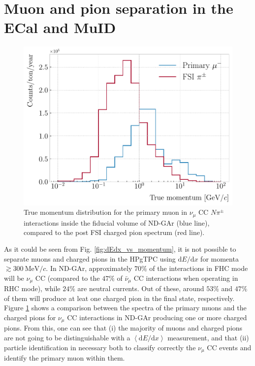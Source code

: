 \section{Muon and pion separation in the ECal and MuID}\label{section:muon_bdt}

\begin{figure}[t]
	\centering
	\includegraphics[width=.70\linewidth]{Images/GArSoft_PID/BDT/ndgar_fhc_numu_cc_mu_spectrum.pdf}
	\caption[True momentum distribution for the primary muon in $\nu_{\mu}$ CC $N\pi^{\pm}$ interactions inside the fiducial volume of ND-GAr, compared to the post FSI charged pion spectrum.]{True momentum distribution for the primary muon in $\nu_{\mu}$ CC $N\pi^{\pm}$ interactions inside the fiducial volume of ND-GAr (blue line), compared to the post FSI charged pion spectrum (red line).}
	\label{fig:primary_muon_spectrum}
\end{figure}

As it could be seen from Fig. \ref{fig:dEdx_vs_momentum}, it is not possible to separate muons and charged pions in the HPgTPC using $\mathrm{d}E/\mathrm{d}x$ for momenta $\gtrsim 300~\mathrm{MeV}/c$. In ND-GAr, approximately $70\%$ of the interactions in FHC mode will be $\nu_{\mu}$ CC (compared to the $47\%$ of $\bar{\nu}_{\mu}$ CC interactions when operating in RHC mode), while $24\%$ are neutral currents. Out of these, around $53\%$ and $47\%$ of them will produce at leat one charged pion in the final state, respectively. Figure \ref{fig:primary_muon_spectrum} shows a comparison between the spectra of the primary muons and the charged pions for $\nu_{\mu}$ CC interactions in ND-GAr producing one or more charged pions. From this, one can see that (i) the majority of muons and charged pions are not going to be distinguishable with a $\left<\mathrm{d}E/\mathrm{d}x\right>$ measurement, and that (ii) particle identification in necessary both to classify correctly the $\nu_{\mu}$ CC events and identify the primary muon within them.

